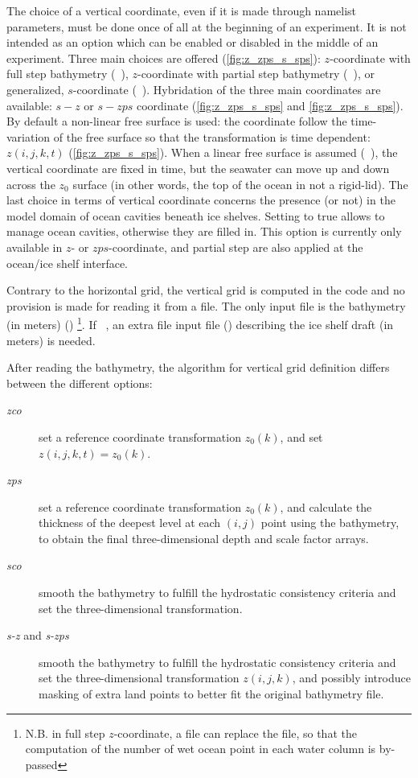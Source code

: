 \documentclass[../main/NEMO_manual]{subfiles}
\begin{document}
The choice of a vertical coordinate, even if it is made through  namelist parameters, 
must be done once of all at the beginning of an experiment.
It is not intended as an option which can be enabled or disabled in the middle of an experiment.
Three main choices are offered (\autoref{fig:z_zps_s_sps}):
$z$-coordinate with full step bathymetry (~),
$z$-coordinate with partial step bathymetry (~),
or generalized, $s$-coordinate (~).
Hybridation of the three main coordinates are available:
$s-z$ or $s-zps$ coordinate (\autoref{fig:z_zps_s_sps} and \autoref{fig:z_zps_s_sps}).
By default a non-linear free surface is used: the coordinate follow the time-variation of the free surface so that
the transformation is time dependent: $z(i,j,k,t)$ (\autoref{fig:z_zps_s_sps}).
When a linear free surface is assumed (~),
the vertical coordinate are fixed in time, but the seawater can move up and down across the $z_0$ surface
(in other words, the top of the ocean in not a rigid-lid).
The last choice in terms of vertical coordinate concerns the presence (or not) in
the model domain of ocean cavities beneath ice shelves.
Setting  to true allows to manage ocean cavities, otherwise they are filled in.
This option is currently only available in $z$- or $zps$-coordinate,
and partial step are also applied at the ocean/ice shelf interface.

Contrary to the horizontal grid, the vertical grid is computed in the code and no provision is made for
reading it from a file.
The only input file is the bathymetry (in meters) ()
\footnote{
  N.B. in full step $z$-coordinate, a  file can replace the  file,
  so that the computation of the number of wet ocean point in each water column is by-passed}.
If ~, an extra file input file () describing
the ice shelf draft (in meters) is needed.

After reading the bathymetry, the algorithm for vertical grid definition differs between the different options:
\begin{description}
\item[\textit{zco}]
  set a reference coordinate transformation $z_0(k)$, and set $z(i,j,k,t) = z_0(k)$.
\item[\textit{zps}]
  set a reference coordinate transformation $z_0(k)$, and calculate the thickness of the deepest level at
  each $(i,j)$ point using the bathymetry, to obtain the final three-dimensional depth and scale factor arrays.
\item[\textit{sco}]
  smooth the bathymetry to fulfill the hydrostatic consistency criteria and
  set the three-dimensional transformation.
\item[\textit{s-z} and \textit{s-zps}]
  smooth the bathymetry to fulfill the hydrostatic consistency criteria and
  set the three-dimensional transformation $z(i,j,k)$,
  and possibly introduce masking of extra land points to better fit the original bathymetry file.
\end{description}
\end{document}
